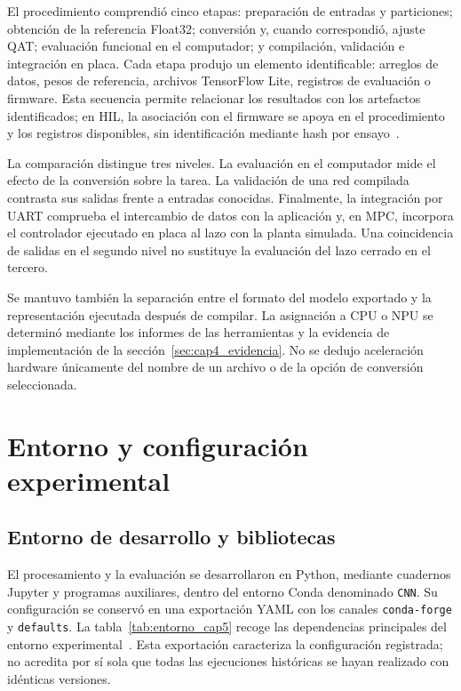 El procedimiento comprendió cinco etapas: preparación de entradas y particiones; obtención de la referencia Float32; conversión y, cuando correspondió, ajuste QAT; evaluación funcional en el computador; y compilación, validación e integración en placa. Cada etapa produjo un elemento identificable: arreglos de datos, pesos de referencia, archivos TensorFlow Lite, registros de evaluación o firmware. Esta secuencia permite relacionar los resultados con los artefactos identificados; en HIL, la asociación con el firmware se apoya en el procedimiento y los registros disponibles, sin identificación mediante hash por ensayo~\cite{cap5_registros}.

La comparación distingue tres niveles. La evaluación en el computador mide el efecto de la conversión sobre la tarea. La validación de una red compilada contrasta sus salidas frente a entradas conocidas. Finalmente, la integración por UART comprueba el intercambio de datos con la aplicación y, en MPC, incorpora el controlador ejecutado en placa al lazo con la planta simulada. Una coincidencia de salidas en el segundo nivel no sustituye la evaluación del lazo cerrado en el tercero.

Se mantuvo también la separación entre el formato del modelo exportado y la representación ejecutada después de compilar. La asignación a CPU o NPU se determinó mediante los informes de las herramientas y la evidencia de implementación de la sección~\ref{sec:cap4_evidencia}. No se dedujo aceleración hardware únicamente del nombre de un archivo o de la opción de conversión seleccionada.

\section{Entorno y configuración experimental}
\label{sec:entorno_experimental}

\subsection{Entorno de desarrollo y bibliotecas}

El procesamiento y la evaluación se desarrollaron en Python, mediante cuadernos Jupyter y programas auxiliares, dentro del entorno Conda denominado \texttt{CNN}. Su configuración se conservó en una exportación YAML con los canales \texttt{conda-forge} y \texttt{defaults}. La tabla~\ref{tab:entorno_cap5} recoge las dependencias principales del entorno experimental~\cite{cap5_entorno}. Esta exportación caracteriza la configuración registrada; no acredita por sí sola que todas las ejecuciones históricas se hayan realizado con idénticas versiones.

